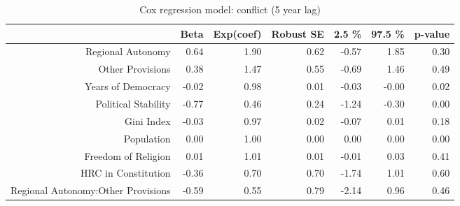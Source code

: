 \begin{table}[ht]
\centering
\begin{tabular}{rrrrrrr}
  \hline
 & Beta & Exp(coef) & Robust SE & 2.5 \% & 97.5 \% & p-value \\ 
  \hline
Regional Autonomy & 0.64 & 1.90 & 0.62 & -0.57 & 1.85 & 0.30 \\ 
  Other Provisions & 0.38 & 1.47 & 0.55 & -0.69 & 1.46 & 0.49 \\ 
  Years of Democracy & -0.02 & 0.98 & 0.01 & -0.03 & -0.00 & 0.02 \\ 
  Political Stability & -0.77 & 0.46 & 0.24 & -1.24 & -0.30 & 0.00 \\ 
  Gini Index & -0.03 & 0.97 & 0.02 & -0.07 & 0.01 & 0.18 \\ 
  Population & 0.00 & 1.00 & 0.00 & 0.00 & 0.00 & 0.00 \\ 
  Freedom of Religion & 0.01 & 1.01 & 0.01 & -0.01 & 0.03 & 0.41 \\ 
  HRC in Constitution & -0.36 & 0.70 & 0.70 & -1.74 & 1.01 & 0.60 \\ 
  Regional Autonomy:Other Provisions & -0.59 & 0.55 & 0.79 & -2.14 & 0.96 & 0.46 \\ 
   \hline
\end{tabular}
\caption{Cox regression model: conflict (5 year lag)} 
\end{table}
